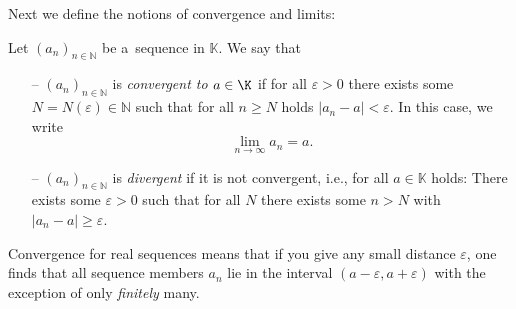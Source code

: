 

Next we define the notions of convergence and limits:
\begin{Definition}\label{def:convlim}
    Let $(a_n)_{n\in\mathbb{N}}$ be a~sequence in $\mathbb{K}$. We say that
\begin{itemize}
 \item[--] $(a_n)_{n\in\mathbb{N}}$ is \emph{convergent to $a\in \K$} if for all $\varepsilon>0$ there exists some $N=N(\varepsilon)\in\mathbb{N}$ such that for all $n\geq N$ holds $|a_n-a|<\varepsilon$. In this case, we write
\[\lim_{n\to\infty}a_n=a.\]
 \item[--] $(a_n)_{n\in\mathbb{N}}$ is \emph{divergent} if it is not convergent, i.e., for all $a\in \mathbb{K}$ holds: There exists some $\varepsilon>0$ such that for all $N$ there exists some $n>N$ with $|a_n-a|\geq\varepsilon$.
\end{itemize}

\end{Definition}

Convergence for real sequences means that if you give any small distance $\varepsilon$, one
finds that all sequence members $a_n$ lie in the interval $(a-\varepsilon, a+\varepsilon)$ with the exception of only \emph{finitely} many.

%  

